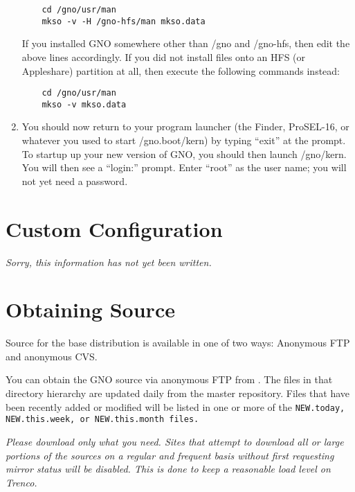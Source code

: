 \documentclass{report}
\begin{document}
\begin{enumerate}
\begin{verbatim}
	cd /gno/usr/man
	mkso -v -H /gno-hfs/man mkso.data
\end{verbatim}

If you installed GNO somewhere other than /gno and /gno-hfs, then
edit the above lines accordingly.  If you did not install files
onto an HFS (or Appleshare) partition at all, then execute the
following commands instead:

\begin{verbatim}
	cd /gno/usr/man
	mkso -v mkso.data
\end{verbatim}

\item
You should now return to your program launcher (the Finder,
ProSEL-16, or whatever you used to start /gno.boot/kern) by
typing ``exit'' at the prompt.  To startup up your new version
of GNO, you should then launch /gno/kern.  You will then see
a ``login:'' prompt.  Enter ``root'' as the user name; you will
not yet need a password.


\end{enumerate}

\section{Custom Configuration}

\it Sorry, this information has not yet been written.\rm

\section{Obtaining Source}

Source for the base distribution is available in one of two ways:
Anonymous FTP and anonymous CVS.

You can obtain the GNO source via anonymous FTP from 
.
The files in that directory hierarchy are updated daily from the
master repository.  Files that have been recently added or modified
will be listed in one or more of the 
\tt NEW.today\rm ,
\tt NEW.this.week\rm , or
\tt NEW.this.month \rm
files.

\em Please download only what you need.  Sites that attempt to download
all or large portions of the sources on a regular and frequent basis
without first requesting mirror status will be disabled. This is done
to keep a reasonable load level on Trenco.\rm
\end{document}
